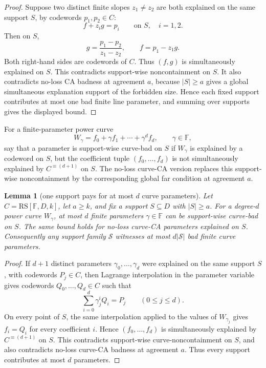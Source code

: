 \documentclass[11pt]{article}
\newtheorem{lemma}[theorem]{Lemma}
\theoremstyle{definition}
\theoremstyle{remark}
\newcommand{\F}{\mathbb{F}}
\newcommand{\RS}{\mathrm{RS}}
\begin{document}
\begin{proof}
Suppose two distinct finite slopes $z_1\ne z_2$ are both explained on the same
support $S$, by codewords $p_1,p_2\in C$:
\[
        f+z_i g=p_i\qquad\text{on }S,\quad i=1,2.
\]
Then on $S$,
\[
        g=\frac{p_1-p_2}{z_1-z_2},\qquad
        f=p_1-z_1g.
\]
Both right-hand sides are codewords of $C$.  Thus $(f,g)$ is simultaneously
explained on $S$.  This contradicts support-wise noncontainment on $S$.  It also
contradicts no-loss CA badness at agreement $a$, because $|S|\ge a$ gives a
global simultaneous explanation support of the forbidden size.  Hence each fixed
support contributes at most one bad finite line parameter, and summing over
supports gives the displayed bound.
\end{proof}

For a finite-parameter power curve
\[
        W_\gamma=f_0+\gamma f_1+\cdots+\gamma^d f_d,
        \qquad \gamma\in\F,
\]
say that a parameter is support-wise curve-bad on $S$ if $W_\gamma$ is explained
by a codeword on $S$, but the coefficient tuple $(f_0,\ldots,f_d)$ is not
simultaneously explained by $C^{\equiv(d+1)}$ on $S$.  The no-loss curve-CA
version replaces this support-wise noncontainment by the corresponding global
far condition at agreement $a$.

\begin{lemma}[one support pays for at most $d$ curve parameters]
\label{lem:one-support-d-curve}
Let $C=\RS[\F,D,k]$, let $a\ge k$, and fix a support $S\subseteq D$ with
$|S|\ge a$.  For a degree-$d$ power curve $W_\gamma$, at most $d$ finite
parameters $\gamma\in\F$ can be support-wise curve-bad on $S$.  The same bound
holds for no-loss curve-CA parameters explained on $S$.  Consequently any
support family $\mathcal S$ witnesses at most $d|\mathcal S|$ bad finite curve
parameters.
\end{lemma}

\begin{proof}
If $d+1$ distinct parameters $\gamma_0,\ldots,\gamma_d$ were explained on the
same support $S$, with codewords $P_j\in C$, then Lagrange interpolation in the
parameter variable gives codewords $Q_0,\ldots,Q_d\in C$ such that
\[
        \sum_{i=0}^d \gamma_j^i Q_i=P_j
        \qquad (0\le j\le d).
\]
On every point of $S$, the same interpolation applied to the values of
$W_{\gamma_j}$ gives $f_i=Q_i$ for every coefficient $i$.  Hence
$(f_0,\ldots,f_d)$ is simultaneously explained by $C^{\equiv(d+1)}$ on $S$.
This contradicts support-wise curve-noncontainment on $S$, and also contradicts
no-loss curve-CA badness at agreement $a$.  Thus every support contributes at
most $d$ parameters.
\end{proof}
\end{document}
